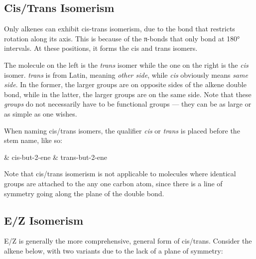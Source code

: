 		\pagebreak
		\subsection{Cis/Trans Isomerism}

			Only alkenes can exhibit cis-trans isomerism, due to the  bond that restricts rotation along its axis. This is because
			of the π-bonds that only bond at 180° intervals. At these positions, it forms the cis and trans isomers.


			The molecule on the left is the \textit{trans} isomer while the one on the right is the \textit{cis} isomer. \textit{trans}
			is from Latin, meaning \textit{other side}, while \textit{cis} obviously means \textit{same side}. In the former,
			the larger groups are on opposite sides of the alkene double bond, while in the latter, the larger groups are on the same
			side. Note that these \textit{groups} do not necessarily have to be functional groups --- they can be as large or as simple
			as one wishes.

			When naming cis/trans isomers, the qualifier \textit{cis} or \textit{trans} is placed before the stem name, like so:
			\begin{bulletlist}
				& cis-but-2-ene
				& trans-but-2-ene
			\end{bulletlist}

			Note that cis/trans isomerism is not applicable to molecules where identical groups are attached to the any one carbon atom,
			since there is a line of symmetry going along the plane of the double bond.






		\pagebreak
		\subsection{E/Z Isomerism}

			E/Z is generally the more comprehensive, general form of cis/trans. Consider the alkene below, with two variants
			due to the lack of a plane of symmetry:

